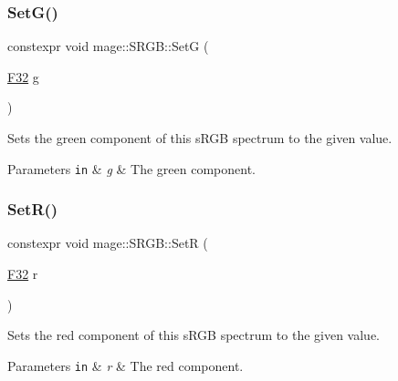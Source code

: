 \subsubsection{\texorpdfstring{Set\+G()}{SetG()}}
{\footnotesize\ttfamily constexpr void mage\+::\+S\+R\+G\+B\+::\+SetG (\begin{DoxyParamCaption}\item[{\mbox{\hyperlink{namespacemage_aa97e833b45f06d60a0a9c4fc22ae02c0}{F32}}}]{g }\end{DoxyParamCaption})\hspace{0.3cm}{\ttfamily [noexcept]}}

Sets the green component of this s\+R\+GB spectrum to the given value.


\begin{DoxyParams}[1]{Parameters}
\mbox{\tt in}  & {\em g} & The green component. \\
\hline
\end{DoxyParams}
\mbox{\label{structmage_1_1_s_r_g_b_a0192829933892af3b9999653b7c976d2}} 
\subsubsection{\texorpdfstring{Set\+R()}{SetR()}}
{\footnotesize\ttfamily constexpr void mage\+::\+S\+R\+G\+B\+::\+SetR (\begin{DoxyParamCaption}\item[{\mbox{\hyperlink{namespacemage_aa97e833b45f06d60a0a9c4fc22ae02c0}{F32}}}]{r }\end{DoxyParamCaption})\hspace{0.3cm}{\ttfamily [noexcept]}}

Sets the red component of this s\+R\+GB spectrum to the given value.


\begin{DoxyParams}[1]{Parameters}
\mbox{\tt in}  & {\em r} & The red component. \\
\hline
\end{DoxyParams}

